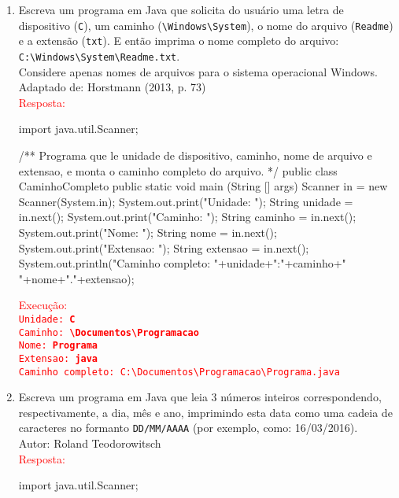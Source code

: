 \documentclass[onecolumn,a4paper,10pt]{report}
\newcommand{\+}{\, + \,}
\newcommand{\<}{\hspace*{-0.4cm}}
\begin{document}
\begin{enumerate}[1.]
\item Escreva um programa em Java que solicita do usuário uma letra de dispositivo (\texttt{C}), um caminho (\texttt{\textbackslash Windows\textbackslash System}), o nome do arquivo (\texttt{Readme}) e a extensão (\texttt{txt}). E então imprima o nome completo do arquivo:\\ \texttt{C:\textbackslash Windows\textbackslash System\textbackslash Readme.txt}.\\Considere apenas nomes de arquivos para o sistema operacional Windows.\\
{\tiny Adaptado de: Horstmann (2013, p. 73)}\\
\textcolor{red}{Resposta:}\\
\begin{javacode}
import java.util.Scanner;

/**
   Programa que le unidade de dispositivo, caminho, nome de arquivo e extensao, e
   monta o caminho completo do arquivo.
*/
public class CaminhoCompleto {
    public static void main (String [] args) {
        Scanner in = new Scanner(System.in);
        System.out.print("Unidade: ");
        String unidade = in.next();
        System.out.print("Caminho: ");
        String caminho = in.next();
        System.out.print("Nome: ");
        String nome = in.next();
        System.out.print("Extensao: ");
        String extensao = in.next();
        System.out.println("Caminho completo: "+unidade+":"+caminho+"\\"+nome+"."+extensao);
    }
}
\end{javacode}
\textcolor{red}{Execução:\\
\texttt{Unidade: \textbf{C}\\
Caminho: \textbf{\textbackslash Documentos\textbackslash Programacao}\\
Nome: \textbf{Programa}\\
Extensao: \textbf{java}\\
Caminho completo: C:\textbackslash Documentos\textbackslash Programacao\textbackslash Programa.java}
}

\item Escreva um programa em Java que leia 3 números inteiros correspondendo, respectivamente, a dia, mês e ano, imprimindo esta data como uma cadeia de caracteres no formanto \texttt{DD/MM/AAAA} (por exemplo, como: 16/03/2016).\\
{\tiny Autor: Roland Teodorowitsch}\\
\textcolor{red}{Resposta:}\\
\begin{javacode}
import java.util.Scanner;


\end{javacode}
\end{enumerate}
\end{document}
